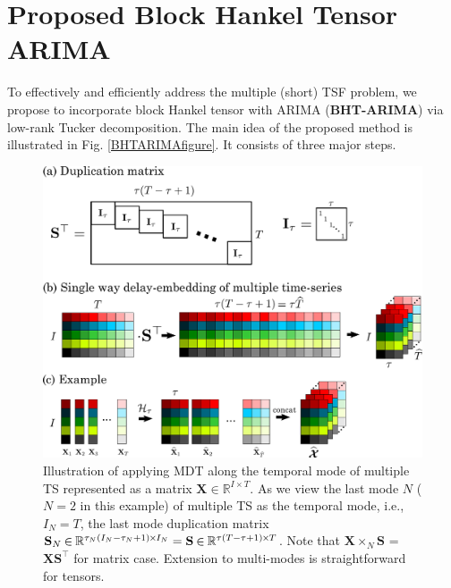 \documentclass[letterpaper]{article} %
\numberwithin{theorem}{section}
\newcommand{\bbR}[1]{\mathbb{R}^{#1}}
\begin{document}
\section{Proposed Block Hankel Tensor ARIMA}\label{sec:proposed}
To  effectively and efficiently address the multiple (short) TSF problem,  
we  propose to  incorporate block Hankel tensor  with ARIMA (\textbf{BHT-ARIMA}) via low-rank Tucker decomposition. The main idea of the proposed method is illustrated in Fig. \ref{BHTARIMAfigure}. It consists of three major steps.  


\begin{figure}[ttt!]
	\centering
	\includegraphics[width=0.9\columnwidth ]{Fig2_MDT_example.pdf}
	\caption{\label{MDTexample}Illustration of applying MDT along the temporal mode of multiple TS  represented  as a matrix $\mathbf{X} \in \bbR{I \times T}$. As we view the last mode $N$ ($N=2$ in this example) of multiple TS as the  temporal mode, i.e., $I_N =T$, the last mode  duplication matrix   $\mathbf S_N\hspace{-0.02cm}  \in \hspace{-0.02cm}  \mathbb{R}^{\tau_N (I_N-\tau_N+1) \hspace{-0.02cm}  \times\hspace{-0.02cm}  I_N} =  \mathbf S\hspace{-0.02cm}  \in \hspace{-0.02cm}  \mathbb{R}^{\tau(T-\tau+1) \hspace{-0.02cm}  \times\hspace{-0.02cm}  T}$. Note that  $\mathbf X \times_N \mathbf S$ =   $\mathbf X \mathbf S^\top$ for  matrix case.  Extension to multi-modes  is straightforward for tensors.}
\end{figure}
\end{document}
